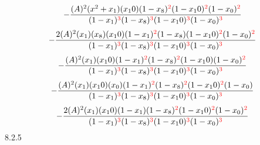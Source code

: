 \documentclass{article}
\begin{document}
\]\[-\frac{(A)^{2}(x^{2}+x_1)(x_10)(1-x_8)^{\textcolor{red}{2}}(1-x_10)^{\textcolor{red}{2}}(1-x_0)^{\textcolor{red}{2}}}{(1-x_1)^{\textcolor{red}{3}}(1-x_8)^{\textcolor{red}{3}}(1-x_10)^{\textcolor{red}{3}}(1-x_0)^{\textcolor{red}{3}}}\]\[-\frac{2(A)^{2}(x_1)(x_8)(x_10)(1-x_1)^{\textcolor{red}{2}}(1-x_8)(1-x_10)^{\textcolor{red}{2}}(1-x_0)^{\textcolor{red}{2}}}{(1-x_1)^{\textcolor{red}{3}}(1-x_8)^{\textcolor{red}{3}}(1-x_10)^{\textcolor{red}{3}}(1-x_0)^{\textcolor{red}{3}}}\]\[-\frac{(A)^{2}(x_1)(x_10)(1-x_1)^{\textcolor{red}{2}}(1-x_8)^{\textcolor{red}{2}}(1-x_10)(1-x_0)^{\textcolor{red}{2}}}{(1-x_1)^{\textcolor{red}{3}}(1-x_8)^{\textcolor{red}{3}}(1-x_10)^{\textcolor{red}{3}}(1-x_0)^{\textcolor{red}{3}}}\]\[-\frac{(A)^{2}(x_1)(x_10)(x_0)(1-x_1)^{\textcolor{red}{2}}(1-x_8)^{\textcolor{red}{2}}(1-x_10)^{\textcolor{red}{2}}(1-x_0)}{(1-x_1)^{\textcolor{red}{3}}(1-x_8)^{\textcolor{red}{3}}(1-x_10)^{\textcolor{red}{3}}(1-x_0)^{\textcolor{red}{3}}}\]\[-\frac{2(A)^{2}(x_1)(x_10)(1-x_1)(1-x_8)^{\textcolor{red}{2}}(1-x_10)^{\textcolor{red}{2}}(1-x_0)^{\textcolor{red}{2}}}{(1-x_1)^{\textcolor{red}{3}}(1-x_8)^{\textcolor{red}{3}}(1-x_10)^{\textcolor{red}{3}}(1-x_0)^{\textcolor{red}{3}}}\]
8.2.5
\end{document}
